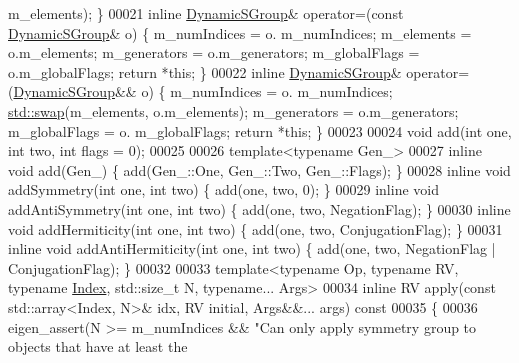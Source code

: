 \begin{DoxyCode}
      m\_elements); \}
00021     \textcolor{keyword}{inline} \hyperlink{class_eigen_1_1_dynamic_s_group}{DynamicSGroup}& operator=(\textcolor{keyword}{const} \hyperlink{class_eigen_1_1_dynamic_s_group}{DynamicSGroup}& o) \{ m\_numIndices = o.
      m\_numIndices; m\_elements = o.m\_elements; m\_generators = o.m\_generators; m\_globalFlags = o.m\_globalFlags; \textcolor{keywordflow}{
      return} *\textcolor{keyword}{this}; \}
00022     \textcolor{keyword}{inline} \hyperlink{class_eigen_1_1_dynamic_s_group}{DynamicSGroup}& operator=(\hyperlink{class_eigen_1_1_dynamic_s_group}{DynamicSGroup}&& o) \{ m\_numIndices = o.
      m\_numIndices; \hyperlink{endian_8c_a3ca5ecd34b04d6a243c054ac3a57f68d}{std::swap}(m\_elements, o.m\_elements); m\_generators = o.m\_generators; m\_globalFlags = o.
      m\_globalFlags; \textcolor{keywordflow}{return} *\textcolor{keyword}{this}; \}
00023 
00024     \textcolor{keywordtype}{void} add(\textcolor{keywordtype}{int} one, \textcolor{keywordtype}{int} two, \textcolor{keywordtype}{int} flags = 0);
00025 
00026     \textcolor{keyword}{template}<\textcolor{keyword}{typename} Gen\_>
00027     \textcolor{keyword}{inline} \textcolor{keywordtype}{void} add(Gen\_) \{ add(Gen\_::One, Gen\_::Two, Gen\_::Flags); \}
00028     \textcolor{keyword}{inline} \textcolor{keywordtype}{void} addSymmetry(\textcolor{keywordtype}{int} one, \textcolor{keywordtype}{int} two) \{ add(one, two, 0); \}
00029     \textcolor{keyword}{inline} \textcolor{keywordtype}{void} addAntiSymmetry(\textcolor{keywordtype}{int} one, \textcolor{keywordtype}{int} two) \{ add(one, two, NegationFlag); \}
00030     \textcolor{keyword}{inline} \textcolor{keywordtype}{void} addHermiticity(\textcolor{keywordtype}{int} one, \textcolor{keywordtype}{int} two) \{ add(one, two, ConjugationFlag); \}
00031     \textcolor{keyword}{inline} \textcolor{keywordtype}{void} addAntiHermiticity(\textcolor{keywordtype}{int} one, \textcolor{keywordtype}{int} two) \{ add(one, two, NegationFlag | ConjugationFlag); \}
00032 
00033     \textcolor{keyword}{template}<\textcolor{keyword}{typename} Op, \textcolor{keyword}{typename} RV, \textcolor{keyword}{typename} \hyperlink{namespace_eigen_a62e77e0933482dafde8fe197d9a2cfde}{Index}, std::size\_t N, \textcolor{keyword}{typename}... Args>
00034     \textcolor{keyword}{inline} RV apply(\textcolor{keyword}{const} std::array<Index, N>& idx, RV initial, Args&&... args)\textcolor{keyword}{ const}
00035 \textcolor{keyword}{    }\{
00036       eigen\_assert(N >= m\_numIndices && \textcolor{stringliteral}{"Can only apply symmetry group to objects that have at least the
}
\end{DoxyCode}
